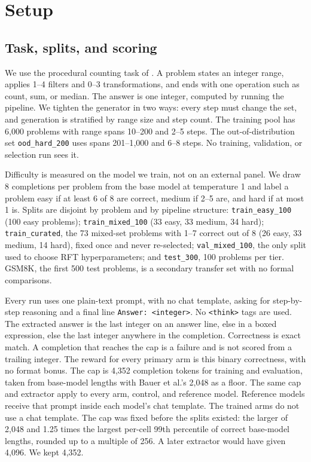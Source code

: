 \section{Setup}
\label{sec:setup}

\subsection{Task, splits, and scoring}
\label{sec:data}

We use the procedural counting task of \citet{bauer2026}. A problem states an integer range, applies 1--4 filters and 0--3 transformations, and ends with one operation such as count, sum, or median. The answer is one integer, computed by running the pipeline. We tighten the generator in two ways: every step must change the set, and generation is stratified by range size and step count. The training pool has 6{,}000 problems with range spans 10--200 and 2--5 steps. The out-of-distribution set \texttt{ood\_hard\_200} uses spans 201--1{,}000 and 6--8 steps. No training, validation, or selection run sees it.

Difficulty is measured on the model we train, not on an external panel. We draw 8 completions per problem from the base model at temperature 1 and label a problem easy if at least 6 of 8 are correct, medium if 2--5 are, and hard if at most 1 is. Splits are disjoint by problem and by pipeline structure: \texttt{train\_easy\_100} (100 easy problems); \texttt{train\_mixed\_100} (33 easy, 33 medium, 34 hard); \texttt{train\_curated}, the 73 mixed-set problems with 1--7 correct out of 8 (26 easy, 33 medium, 14 hard), fixed once and never re-selected; \texttt{val\_mixed\_100}, the only split used to choose RFT hyperparameters; and \texttt{test\_300}, 100 problems per tier. GSM8K, the first 500 test problems, is a secondary transfer set with no formal comparisons.

Every run uses one plain-text prompt, with no chat template, asking for step-by-step reasoning and a final line \texttt{Answer: <integer>}. No \texttt{<think>} tags are used. The extracted answer is the last integer on an answer line, else in a boxed expression, else the last integer anywhere in the completion. Correctness is exact match. A completion that reaches the cap is a failure and is not scored from a trailing integer. The reward for every primary arm is this binary correctness, with no format bonus. The cap is 4{,}352 completion tokens for training and evaluation, taken from base-model lengths with Bauer et al.'s 2{,}048 as a floor. The same cap and extractor apply to every arm, control, and reference model. Reference models receive that prompt inside each model's chat template. The trained arms do not use a chat template. The cap was fixed before the splits existed: the larger of 2{,}048 and 1.25 times the largest per-cell 99th percentile of correct base-model lengths, rounded up to a multiple of 256. A later extractor would have given 4{,}096. We kept 4{,}352.

